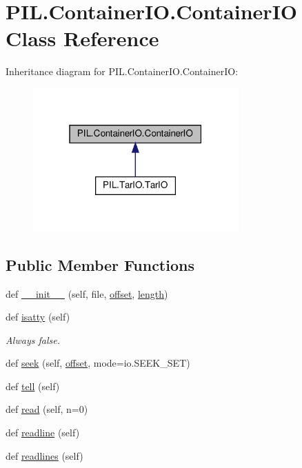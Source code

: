 \hypertarget{classPIL_1_1ContainerIO_1_1ContainerIO}{}\section{P\+I\+L.\+Container\+I\+O.\+Container\+IO Class Reference}
\label{classPIL_1_1ContainerIO_1_1ContainerIO}


Inheritance diagram for P\+I\+L.\+Container\+I\+O.\+Container\+IO\+:
\nopagebreak
\begin{figure}[H]
\begin{center}
\leavevmode
\includegraphics[width=223pt]{classPIL_1_1ContainerIO_1_1ContainerIO__inherit__graph}
\end{center}
\end{figure}
\subsection*{Public Member Functions}
\begin{DoxyCompactItemize}
\item 
def \hyperlink{classPIL_1_1ContainerIO_1_1ContainerIO_ac7ffeb406a642696aeb27d9d9f7a4e80}{\+\_\+\+\_\+init\+\_\+\+\_\+} (self, file, \hyperlink{classPIL_1_1ContainerIO_1_1ContainerIO_a50de357582e95edf2e1a90eeabbe33ab}{offset}, \hyperlink{classPIL_1_1ContainerIO_1_1ContainerIO_ae2306c1c802448c44751f098a8ae55f9}{length})
\item 
def \hyperlink{classPIL_1_1ContainerIO_1_1ContainerIO_a0d34de3c308d8dcc279e7df07a83efb2}{isatty} (self)
\begin{DoxyCompactList}\small\item\em Always false. \end{DoxyCompactList}\item 
def \hyperlink{classPIL_1_1ContainerIO_1_1ContainerIO_a22eaf0957574b0a177e39fdc53c82d4d}{seek} (self, \hyperlink{classPIL_1_1ContainerIO_1_1ContainerIO_a50de357582e95edf2e1a90eeabbe33ab}{offset}, mode=io.\+S\+E\+E\+K\+\_\+\+S\+ET)
\item 
def \hyperlink{classPIL_1_1ContainerIO_1_1ContainerIO_afc043d99ba3496a93897d868c69e0779}{tell} (self)
\item 
def \hyperlink{classPIL_1_1ContainerIO_1_1ContainerIO_aa3610e51889f802c09cea2a7e7193afe}{read} (self, n=0)
\item 
def \hyperlink{classPIL_1_1ContainerIO_1_1ContainerIO_a8b4f0cbd395d75ebf4e9f30b0bfc985d}{readline} (self)
\item 
def \hyperlink{classPIL_1_1ContainerIO_1_1ContainerIO_a947540fef26774382293b899fc5d6e01}{readlines} (self)
\end{DoxyCompactItemize}
